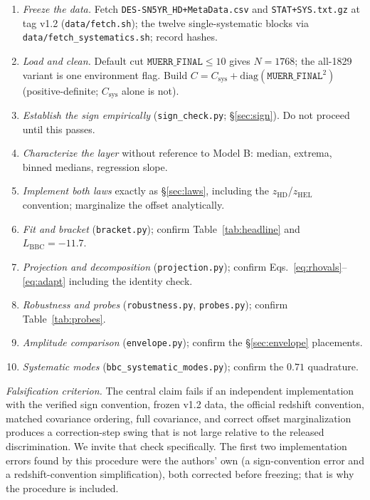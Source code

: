 \documentclass[11pt]{article}
\begin{document}
\begin{enumerate}
\item \emph{Freeze the data.} Fetch \texttt{DES-SN5YR\_HD+MetaData.csv}
  and \texttt{STAT+SYS.txt.gz} at tag v1.2 (\texttt{data/fetch.sh});
  the twelve single-systematic blocks via
  \texttt{data/fetch\_systematics.sh}; record hashes.
\item \emph{Load and clean.} Default cut $\texttt{MUERR\_FINAL} \leq 10$
  gives $N = 1768$; the all-1829 variant is one environment flag. Build
  $C = C_{\mathrm{sys}} + \mathrm{diag}(\texttt{MUERR\_FINAL}^2)$
  (positive-definite; $C_{\mathrm{sys}}$ alone is not).
\item \emph{Establish the sign empirically} (\texttt{sign\_check.py};
  \S\ref{sec:sign}). Do not proceed until this passes.
\item \emph{Characterize the layer} without reference to Model B: median,
  extrema, binned medians, regression slope.
\item \emph{Implement both laws} exactly as \S\ref{sec:laws}, including
  the $z_{\mathrm{HD}}$/$z_{\mathrm{HEL}}$ convention; marginalize the
  offset analytically.
\item \emph{Fit and bracket} (\texttt{bracket.py}); confirm
  Table~\ref{tab:headline} and $L_{\mathrm{BBC}} = -11.7$.
\item \emph{Projection and decomposition} (\texttt{projection.py});
  confirm Eqs.~\eqref{eq:rhovals}--\eqref{eq:adapt} including the
  identity check.
\item \emph{Robustness and probes} (\texttt{robustness.py},
  \texttt{probes.py}); confirm Table~\ref{tab:probes}.
\item \emph{Amplitude comparison} (\texttt{envelope.py}); confirm the
  \S\ref{sec:envelope} placements.
\item \emph{Systematic modes} (\texttt{bbc\_systematic\_modes.py});
  confirm the $0.71$ quadrature.
\end{enumerate}

\emph{Falsification criterion.} The central claim fails if an independent
implementation with the verified sign convention, frozen v1.2 data, the
official redshift convention, matched covariance ordering, full
covariance, and correct offset marginalization produces a correction-step
swing that is not large relative to the released discrimination. We
invite that check specifically. The first two implementation errors found
by this procedure were the authors' own (a sign-convention error and a
redshift-convention simplification), both corrected before freezing;
that is why the procedure is included.
\end{document}
